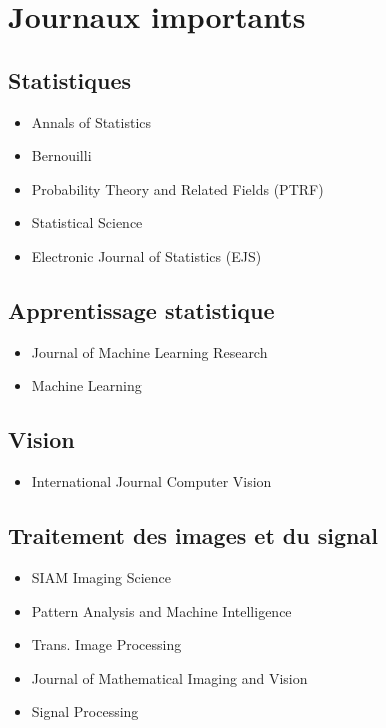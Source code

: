 \section{Journaux importants}


\subsection{Statistiques}
\begin{itemize}
 \item Annals of Statistics
 \item Bernouilli
 \item Probability  Theory and Related Fields (PTRF)
 \item Statistical Science
 \item Electronic Journal of Statistics (EJS)
\end{itemize}

\subsection{Apprentissage statistique}
\begin{itemize}
 \item Journal of Machine Learning Research
 \item Machine Learning
\end{itemize}

\subsection{Vision}
\begin{itemize}
\item International Journal Computer Vision
\end{itemize}

\subsection{Traitement des images et du signal}
\begin{itemize}
 \item SIAM Imaging Science
 \item Pattern Analysis and Machine Intelligence 
 \item Trans. Image Processing
 \item Journal of Mathematical Imaging and Vision
 \item Signal Processing
\end{itemize}




